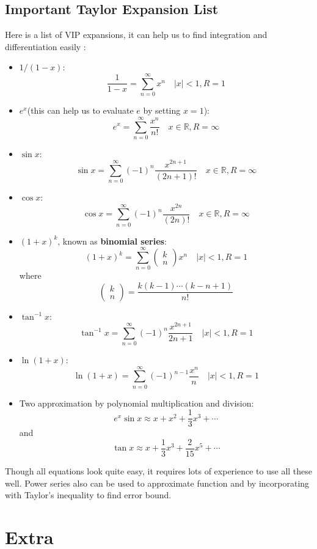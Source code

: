 \documentclass[10pt,a4paper,oneside]{article}
\begin{document}
\subsection{Important Taylor Expansion List}
Here is a list of VIP expansions, it can help us to find integration and differentiation easily :
\begin{itemize}
	\item $1/(1-x)$:
	\[
	\frac{1}{1-x} = \sum_{n=0}^{\infty} x^n  \quad |x|<1, R=1
	\]
	\item $e^x$(this can help us to evaluate $e$ by setting $x=1$):
	\[
	e^x = \sum_{n=0}^{\infty} \frac{x^n}{n!} \quad x \in \mathbb{R}, R = \infty
	\]
	\item $\sin x$:
	\[
	\sin x = \sum_{n=0}^{\infty} (-1)^n \frac{x^{2n+1}}{(2n+1)!} \quad x \in \mathbb{R}, R = \infty
	\]
	\item $\cos x$:
	\[
	\cos x = \sum_{n=0}^{\infty} (-1)^n \frac{x^{2n}}{(2n)!} \quad x \in \mathbb{R},R = \infty
	\]
	\item $(1+x)^k$, known as \textbf{binomial series}:
	\[
	(1+x)^k = \sum_{n=0}^{\infty} \begin{pmatrix}
	k \\n
	\end{pmatrix} x^n \quad |x| < 1, R= 1
	\]
	where
	\[
	\begin{pmatrix}
	k \\n
	\end{pmatrix} = \frac{k(k-1)\cdots(k-n+1)}{n!}
	\]
	\item $\tan^{-1} x$:
	\[
	\tan^{-1} x = \sum_{n=0}^{\infty} (-1)^n \frac{x^{2n+1}}{2n+1} \quad |x| < 1, R= 1
	\]
	\item $\ln (1+x)$:
	\[
	\ln (1+x) = \sum_{n=0}^{\infty} (-1)^{n-1} \frac{x^n}{n} \quad |x| < 1, R= 1
	\]
	\item Two approximation by polynomial multiplication and division:
	\[
	e^x \sin x \approx x + x^2 +\frac{1}{3}x^3 + \cdots
	\]
	and
	\[
	\tan x \approx x + \frac{1}{3} x^3 +\frac{2}{15} x^5 + \cdots
	\]
\end{itemize}
Though all equations look quite easy, it requires lots of experience to use all these well. Power series also can be used to approximate function and by incorporating with Taylor's inequality to find error bound.







\section{Extra}
\end{document}
